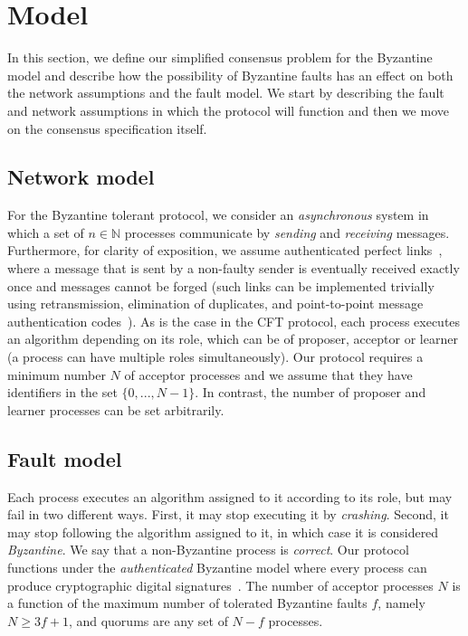 \section{Model} \label{bft_model}

In this section, we define our simplified consensus problem for the Byzantine model and describe how the possibility of Byzantine faults has an effect on both the network assumptions and the fault model. We start by describing the fault and network assumptions in which the protocol will function and then we move on the consensus specification itself.

\subsection{Network model}
For the Byzantine tolerant protocol, we consider an \emph{asynchronous} system in which a set of $n \in \mathbb{N}$ processes communicate by \emph{sending} and \emph{receiving} messages. Furthermore, for clarity of exposition, we assume authenticated perfect links~\cite{cgr:book}, where a message that is sent by a non-faulty sender is eventually received exactly once and messages cannot be forged (such links can be implemented trivially using retransmission, elimination of duplicates, and point-to-point message authentication codes~\cite{cgr:book}). As is the case in the CFT protocol, each process executes an algorithm depending on its role, which can be of proposer, acceptor or learner (a process can have multiple roles simultaneously). Our protocol requires a minimum number $N$ of acceptor processes and we assume that they have identifiers in the set $\{0,...,N-1\}$. In contrast, the number of proposer and learner processes can be set arbitrarily.

\subsection{Fault model}
Each process executes an algorithm assigned to it according to its role, but may fail in two different ways. First, it may stop executing it by \emph{crashing}. Second, it may stop following the algorithm assigned to it, in which case it is considered \emph{Byzantine}. We say that a non-Byzantine process is \emph{correct}. Our protocol functions under the \emph{authenticated} Byzantine model where every process can produce cryptographic digital signatures~\cite{quorum}. The number of acceptor processes $N$ is a function of the maximum number of tolerated Byzantine faults $f$, namely $N \ge 3f+1$, and quorums are any set of $N-f$ processes. 

